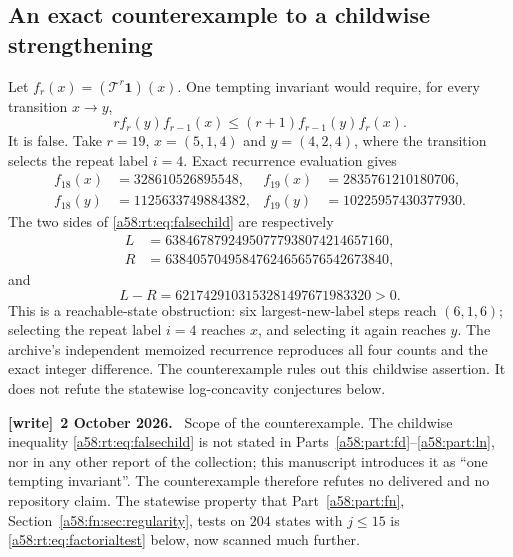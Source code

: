 \documentclass[11pt,letterpaper]{article}
\theoremstyle{remark}
\newcommand{\TT}{\mathcal T}
\newcommand{\one}{\mathbf 1}
\newenvironment{writenote}[1][]{\par\smallskip\begingroup\small
 \noindent\textbf{[write]}\if\relax\detokenize{#1}\relax\else~\textbf{#1.}\fi\ }%
 {\par\endgroup\smallskip}
\begin{document}
\subsection{An exact counterexample to a childwise strengthening}
Let $f_r(x)=(\TT^r\one)(x)$. One tempting invariant would require,
for every transition $x\to y$,
\begin{equation}\label{a58:rt:eq:falsechild}
 r f_r(y)f_{r-1}(x)
 \le(r+1)f_{r-1}(y)f_r(x).
\end{equation}
It is false. Take $r=19$, $x=(5,1,4)$ and $y=(4,2,4)$, where the
transition selects the repeat label $i=4$. Exact recurrence evaluation
gives
\begin{align*}
 f_{18}(x)&=328610526895548,&
 f_{19}(x)&=2835761210180706,\\
 f_{18}(y)&=1125633749884382,&
 f_{19}(y)&=10225957430377930.
\end{align*}
The two sides of \eqref{a58:rt:eq:falsechild} are respectively
\begin{align*}
 L&=63846787924950777938074214657160,\\
 R&=63840570495847624656576542673840,
\end{align*}
and
\[
 L-R=6217429103153281497671983320>0.
\]
This is a reachable-state obstruction: six largest-new-label steps
reach $(6,1,6)$; selecting the repeat label $i=4$ reaches $x$, and
selecting it again reaches $y$. The archive's independent memoized
recurrence reproduces all four counts and the exact integer difference.
The counterexample rules out this childwise assertion. It does not
refute the statewise log-concavity conjectures below.
\begin{writenote}[2 October 2026]
Scope of the counterexample. The childwise inequality \eqref{a58:rt:eq:falsechild} is not stated in Parts~\ref{a58:part:fd}--\ref{a58:part:ln}, nor in any other report of the collection; this manuscript introduces it as ``one tempting invariant''. The counterexample therefore refutes no delivered and no repository claim. The statewise property that Part~\ref{a58:part:fn}, Section~\ref{a58:fn:sec:regularity}, tests on $204$ states with $j\le15$ is \eqref{a58:rt:eq:factorialtest} below, now scanned much further.
\end{writenote}
\end{document}
